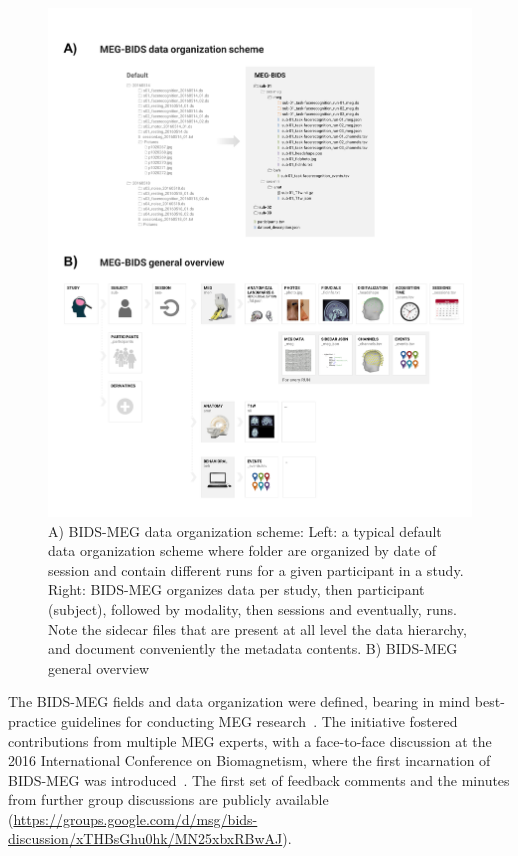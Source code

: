 \begin{figure}[htb!]
\begin{center}
   \includegraphics[width=\linewidth]{figures/MEG-BIDS.png}
\end{center}
   \caption[BIDS-MEG data organization scheme.]{ A) BIDS-MEG data organization scheme: Left: a typical default data organization scheme where folder are organized by date of session and contain different runs for a given participant in a study. Right: BIDS-MEG organizes data per study, then participant (subject), followed by modality, then sessions and eventually, runs. Note the sidecar files that are present at all level the data hierarchy, and document conveniently the metadata contents. B) BIDS-MEG general overview}
   \label{fig:BIDS-MEG}
\end{figure}

The BIDS-MEG fields and data organization were defined, bearing in mind best-practice guidelines for conducting MEG research~\citep{gross2013good}. The initiative fostered contributions from multiple MEG experts, with a face-to-face discussion at the 2016 International Conference on Biomagnetism, where the first incarnation of BIDS-MEG was introduced~\citep{niso2016megbids}. The first set of feedback comments and the minutes from further group discussions are publicly available
(\url{https://groups.google.com/d/msg/bids-discussion/xTHBsGhu0hk/MN25xbxRBwAJ}).

